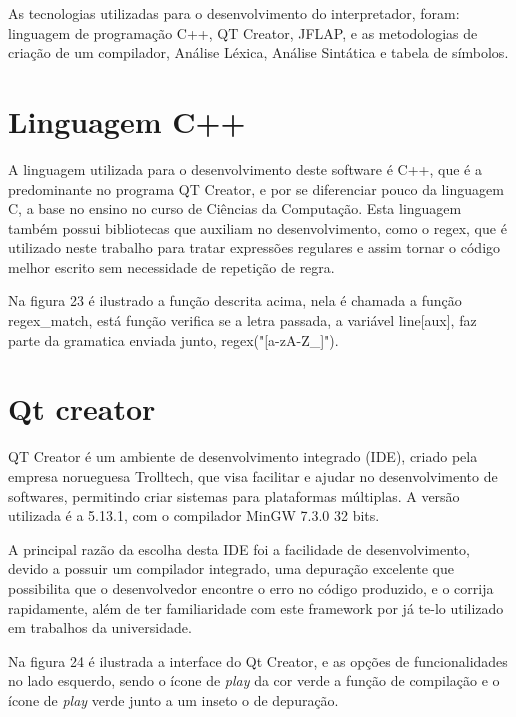 \documentclass[12pt,oneside,a4paper,chapter=TITLE,section=TITLE,sumario=tradicional]{abntex2}
\begin{document}
As tecnologias utilizadas para o desenvolvimento do interpretador, foram: linguagem de programação C++, QT Creator, JFLAP, e as metodologias de criação de um compilador, Análise Léxica, Análise Sintática e tabela de símbolos.  

\section{Linguagem C++}
\label{sec:linugagemc++}

A linguagem utilizada para o desenvolvimento deste software é C++, que é a predominante no programa QT Creator, e por se diferenciar pouco da linguagem C, a base no ensino no curso de Ciências da Computação. Esta linguagem também possui bibliotecas que auxiliam no desenvolvimento, como o regex, que é utilizado neste trabalho para tratar expressões regulares e assim tornar o código melhor escrito sem necessidade de repetição de regra.

Na figura 23 é ilustrado a função descrita acima, nela é chamada a função regex\_match, está função verifica se a letra passada, a variável line[aux], faz parte da gramatica enviada junto, regex("[a-zA-Z\_]").

\begin{figure}[htb]
\end{figure} 

\section{Qt creator}
\label{sec:qtcreator}

QT Creator é um ambiente de desenvolvimento integrado (IDE), criado pela empresa norueguesa Trolltech, que visa facilitar e ajudar no desenvolvimento de softwares, permitindo criar sistemas para plataformas múltiplas. A versão utilizada é a 5.13.1, com o compilador MinGW 7.3.0 32 bits. 

A principal razão da escolha desta IDE foi a facilidade de desenvolvimento, devido a possuir um compilador integrado, uma depuração excelente que possibilita que o desenvolvedor encontre o erro no código produzido, e o corrija rapidamente, além de ter familiaridade com este framework por já te-lo utilizado em trabalhos da universidade. 

Na figura 24 é ilustrada a interface do Qt Creator, e as opções de funcionalidades no lado esquerdo, sendo o ícone de \textit{play} da cor verde a função de compilação e o ícone de \textit{play} verde junto a um inseto o de depuração.
\end{document}
